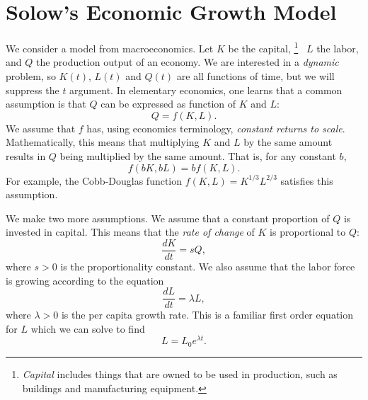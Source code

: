 \documentclass[reqno]{immbook}
\numberwithin{equation}{chapter}
\numberwithin{question}{section}
\numberwithin{theorem}{chapter}
\numberwithin{figure}{chapter}
\theoremstyle{definition}
\begin{document}
\section{Solow's Economic Growth Model}

We consider a model from macroeconomics.
Let $K$ be the capital,%
\footnote{\emph{Capital} includes things that are owned to be used
in production, such as buildings and manufacturing equipment.}%
~$L$ the labor, and $Q$ the production output of an economy.
We are interested in a \emph{dynamic} problem, so $K(t)$, $L(t)$ and
$Q(t)$ are all functions of time, but we will suppress the $t$ argument.
In elementary economics, one learns that a common assumption is that
$Q$ can be expressed as function of $K$ and $L$:
\begin{equation}
   Q = f(K,L).
   \label{EQN:PROD}
\end{equation}
We assume that $f$ has, using economics terminology,
\emph{constant returns to scale}.  Mathematically, this means
that multiplying $K$ and $L$ by the same amount results in $Q$ being
multiplied by the same amount.  That is, for any constant $b$,
\begin{equation}
   f(bK,bL) = bf(K,L).
\end{equation}
For example, the Cobb-Douglas function
$f(K,L) = K^{1/3}L^{2/3}$
satisfies this assumption.

We make two more assumptions.
We assume that a constant proportion of $Q$ is invested in capital.
This means that the \emph{rate of change} of $K$ is proportional to
$Q$:
\begin{equation}
    \frac{dK}{dt} = s Q,
\label{EQN:DKDT}
\end{equation}
where $s > 0$ is the proportionality constant.
We also assume that the labor force is growing according
to the equation
\begin{equation}
   \frac{dL}{dt} = \lambda L,
   \label{EQN:DLDT}
\end{equation}
where $\lambda > 0$ is the per capita growth rate.  This is a
familiar first order equation for $L$ which we can solve to find 
\begin{equation}
    L = L_0 e^{\lambda t}.
\label{eqn:solowLsol}
\end{equation}
\end{document}
